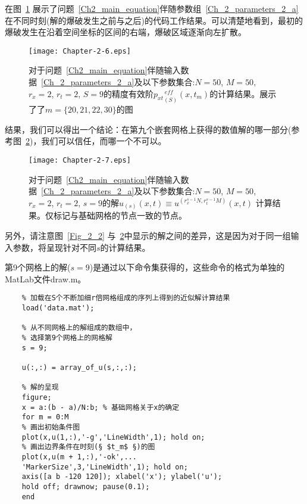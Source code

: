 \documentclass[twoside]{book}
\begin{document}
\begin{CJK*}{GBK}{song}
	在图~\ref{Fig_2_6} 展示了问题~\eqref{Ch2_main_equation}伴随参数组~\eqref{Ch_2_parameters_2_a}在不同时刻(解的爆破发生之前与之后)的代码工作结果。可以清楚地看到，最初的爆破发生在沿着空间坐标的区间的右端，爆破区域逐渐向左扩散。
	
	\begin{figure}[h!]
		\centering
		\texttt{[image: Chapter-2-6.eps]}\\
		\caption{对于问题~\eqref{Ch2_main_equation}伴随输入数据~\eqref{Ch_2_parameters_2_a}及以下参数集合:$N = 50$, $M = 50$, $r_x = 2$, $r_t = 2$, $S = 9$的精度有效阶${p_{xt}}^{\, eff}_{(S)}(x,t_m)$的计算结果。展示了了$m = \{20,21,22,30\}$的图}
		\label{Fig_2_6}
	\end{figure}
	
	结果，我们可以得出一个结论：在第九个嵌套网格上获得的数值解的哪一部分(参考图~\ref{Fig_2_7})，我们可以信任，而哪一个不可以。
	\begin{figure}[t]
		\centering
		\texttt{[image: Chapter-2-7.eps]}\\
		\caption{对于问题~\eqref{Ch2_main_equation}伴随输入数据~\eqref{Ch_2_parameters_2_a}及以下参数集合:$N = 50$, $M = 50$, $r_x = 2$, $r_t = 2$, $s = 9$的解$u_{(s)}(x,t) \equiv u^{(r_x^{s - 1}N,r_t^{s - 1}M)}(x,t)$ 计算结果。仅标记与基础网格的节点一致的节点。}
		\label{Fig_2_7}
	\end{figure}
	
	另外，请注意图~\ref{Fig_2_2} 与~\ref{Fig_2_7}中显示的解之间的差异，这是因为对于同一组输入参数，将呈现针对不同$s$的计算结果。

	第9个网格上的解($s = 9$)是通过以下命令集获得的，这些命令的格式为单独的MatLab文件draw.m。

\begin{framed}
	\begin{lstlisting}
	% 加载在S个不断加细r倍网格组成的序列上得到的近似解计算结果
	load('data.mat');
	
	% 从不同网格上的解组成的数组中，
	% 选择第9个网格上的网格解
	s = 9;
	
	u(:,:) = array_of_u(s,:,:);
	
	% 解的呈现
	figure;
	x = a:(b - a)/N:b; % 基础网格关于x的确定
	for m = 0:M
	% 画出初始条件图
	plot(x,u(1,:),'-g','LineWidth',1); hold on;
	% 画出边界条件在时刻(§ $t_m$ §)的图
	plot(x,u(m + 1,:),'-ok',...
	'MarkerSize',3,'LineWidth',1); hold on;
	axis([a b -120 120]); xlabel('x'); ylabel('u');
	hold off; drawnow; pause(0.1);
	end
	\end{lstlisting}
\end{framed}



\end{CJK*}
\end{document}

